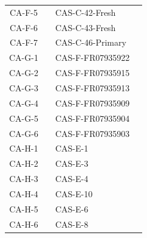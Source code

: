 \begin{table}[!ht]
\begin{tabular}{c|c|l|c}
CA-F-5 &  \cellcolor{white} &CAS-C-42-Fresh & \cellcolor{blue!9} \\ 
CA-F-6 &  \cellcolor{white} &CAS-C-43-Fresh & \cellcolor{blue!9} \\ 
CA-F-7 &  \cellcolor{white} &CAS-C-46-Primary & \cellcolor{blue!9} \multirow{-7}{*}{WES}\\ 
\hhline{-|~|-|-}
CA-G-1 &  \cellcolor{white} &CAS-F-FR07935922 & \cellcolor{green!9}\\ 
CA-G-2 &  \cellcolor{white} &CAS-F-FR07935915 & \cellcolor{green!9} \\ 
CA-G-3 &  \cellcolor{white} &CAS-F-FR07935913 & \cellcolor{green!9} \\ 
CA-G-4 &  \cellcolor{white} &CAS-F-FR07935909 & \cellcolor{green!9} \\ 
CA-G-5 &  \cellcolor{white} &CAS-F-FR07935904 & \cellcolor{green!9} \\ 
CA-G-6 &  \cellcolor{white} &CAS-F-FR07935903 & \cellcolor{green!9}\multirow{-6}{*}{WGS} \\ 
\hhline{-|~|-|-}
CA-H-1 &  \cellcolor{white} &CAS-E-1 & \cellcolor{blue!9}\\ 
CA-H-2 &  \cellcolor{white} &CAS-E-3 & \cellcolor{blue!9} \\ 
CA-H-3 &  \cellcolor{white} &CAS-E-4 & \cellcolor{blue!9} \\ 
CA-H-4 &  \cellcolor{white} &CAS-E-10 & \cellcolor{blue!9} \\ 
CA-H-5 &  \cellcolor{white} &CAS-E-6 & \cellcolor{blue!9} \\ 
CA-H-6 & \cellcolor{white}\multirow{-47}{*}{\citeauthor*{Vergara2021} \cite{Vergara2021}} & CAS-E-8 & \cellcolor{blue!9} \multirow{-6}{*}{WES}\\ 
\bottomrule
\end{tabular}
\end{table}

\clearpage

